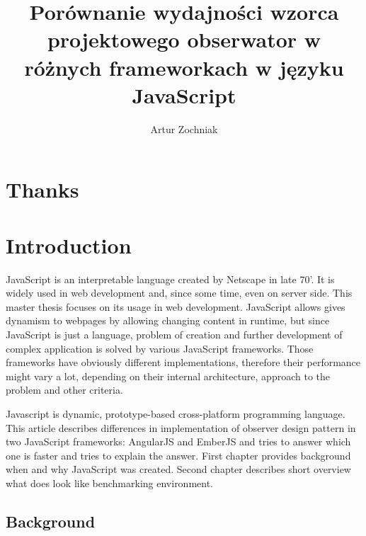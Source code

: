 \documentclass[inzynier,druk,ramka]{tex/dyplom}
\author{Artur Zochniak}
\title{Porównanie wydajności wzorca projektowego obserwator w różnych frameworkach w języku JavaScript}
\begin{document}
\maketitle

\tableofcontents

\listoffigures

\listoftables

% 

\chapter{Thanks}



\chapter{Introduction}
JavaScript is an interpretable language created by Netscape in late 70’. It is widely used in web development and, since some time, even on server side. This master thesis focuses on its usage in web development. JavaScript allows gives dynamism to webpages by allowing changing content in runtime, but since JavaScript is just a language, problem of creation and further development of complex application is solved by various JavaScript frameworks. Those frameworks have obviously different implementations, therefore their performance might vary a lot, depending on their internal architecture, approach to the problem and other criteria. 

Javascript is dynamic, prototype-based cross-platform programming language. 
This article describes differences in implementation of observer design pattern in two JavaScript frameworks: AngularJS and EmberJS and tries to answer which one is faster and tries to explain the answer. 
First chapter provides background when and why JavaScript was created. 
Second chapter describes short overview what does look like benchmarking environment.

\section{Background}
\end{document}
